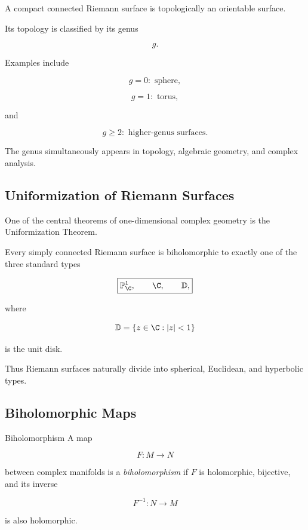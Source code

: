 A compact connected Riemann surface is topologically an orientable surface.

Its topology is classified by its genus

\[
g.
\]

Examples include

\[
\boxed{
g=0:
\text{ sphere},
}
\]

\[
\boxed{
g=1:
\text{ torus},
}
\]

and

\[
\boxed{
g\geq2:
\text{ higher-genus surfaces}.
}
\]

The genus simultaneously appears in topology, algebraic geometry, and
complex analysis.

\subsection{Uniformization of Riemann Surfaces}
\label{subsec:uniformization-riemann-surfaces}

One of the central theorems of one-dimensional complex geometry is the
Uniformization Theorem.

\begin{theorem}
Every simply connected Riemann surface is biholomorphic to exactly one of the
three standard types

\[
\boxed{
\mathbb{P}^1_{\C},
\qquad
\C,
\qquad
\mathbb{D},
}
\]

where

\[
\mathbb{D}
=
\{z\in\C:|z|<1\}
\]

is the unit disk.
\end{theorem}

Thus Riemann surfaces naturally divide into spherical, Euclidean, and
hyperbolic types.

\subsection{Biholomorphic Maps}
\label{subsec:biholomorphic-maps}

\begin{definitionbox}{Biholomorphism}
A map

\[
F:M\to N
\]

between complex manifolds is a \emph{biholomorphism} if \(F\) is holomorphic,
bijective, and its inverse

\[
F^{-1}:N\to M
\]

is also holomorphic.
\end{definitionbox}

